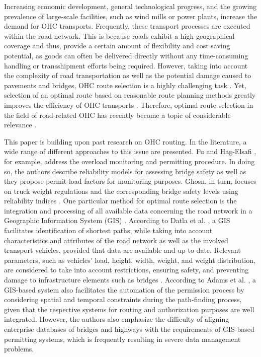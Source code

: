 %

Increasing economic development, general technological progress, and the growing prevalence of large-scale facilities, such as wind mills or power plants, increase the demand for OHC transports.
Frequently, these transport processes are executed within the road network. This is because roads exhibit a high geographical coverage and thus, provide a certain amount of flexibility and cost saving potential, as goods can often be delivered directly without any time-consuming handling or transshipment efforts being required. However, taking into account the complexity of road transportation as well as the potential damage caused to pavements and bridges, OHC route selection is a highly challenging task \cite{Bazaras.2013, xu2001methodology, sivilevicius2007dynamics, fiorillo2016minimizing}. Yet, selection of an optimal route based on reasonable route planning methods greatly improves the efficiency of OHC transports \cite{meng2015optimized}.
Therefore, optimal route selection in the field of road-related OHC has recently become a topic of considerable relevance \cite{geisberger2011efficient, yan2018optimal}.
\par
This paper is building upon past research on OHC routing. In the literature, a wide range of different approaches to this issue are presented. Fu and Hag-Elsafi \cite{fu2000vehicular}, for example, address the overload monitoring and permitting procedure. In doing so, the authors describe reliability models for assessing bridge safety as well as they propose permit-load factors for monitoring purposes. Ghosn, in turn, focuses on truck weight regulations and the corresponding bridge safety levels using reliability indices \cite{ghosn2000development}.
One particular method for optimal route selection is the integration and processing of all available data concerning the road network in a Geographic Information System (GIS) \cite{durham2002gis}.
According to Datla et al. \cite{datla2004gis}, a GIS facilitates identification of shortest paths, while taking into account characteristics and attributes of the road network as well as the involved transport vehicles, provided that data are available and up-to-date. Relevant parameters, such as vehicles' load, height, width, weight, and weight distribution, are considered to take into account restrictions, ensuring safety, and preventing damage to infrastructure elements such as bridges \cite{ecmt2006improving, vaitkus2016effect, kombe2017modelling, pauer2017development}. According to Adams et al. \cite{adams2002enterprise}, a GIS-based system also facilitates the automation of the permission process by considering spatial and temporal constraints during the path-finding process, given that the respective systems for routing and authorization purposes are well integrated. However, the authors also emphasize the difficulty of aligning enterprise databases of bridges and highways with the requirements of GIS-based permitting systems, which is frequently resulting in severe data management problems.

